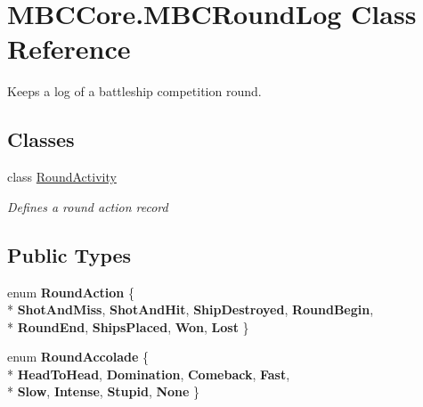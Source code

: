 \hypertarget{class_m_b_c_core_1_1_m_b_c_round_log}{\section{M\-B\-C\-Core.\-M\-B\-C\-Round\-Log Class Reference}
\label{class_m_b_c_core_1_1_m_b_c_round_log}
}


Keeps a log of a battleship competition round. 


\subsection*{Classes}
\begin{DoxyCompactItemize}
\item 
class \hyperlink{class_m_b_c_core_1_1_m_b_c_round_log_1_1_round_activity}{Round\-Activity}
\begin{DoxyCompactList}\small\item\em Defines a round action record\end{DoxyCompactList}\end{DoxyCompactItemize}
\subsection*{Public Types}
\begin{DoxyCompactItemize}
\item 
enum {\bfseries Round\-Action} \{ \\*
{\bfseries Shot\-And\-Miss}, 
{\bfseries Shot\-And\-Hit}, 
{\bfseries Ship\-Destroyed}, 
{\bfseries Round\-Begin}, 
\\*
{\bfseries Round\-End}, 
{\bfseries Ships\-Placed}, 
{\bfseries Won}, 
{\bfseries Lost}
 \}
\item 
enum {\bfseries Round\-Accolade} \{ \\*
{\bfseries Head\-To\-Head}, 
{\bfseries Domination}, 
{\bfseries Comeback}, 
{\bfseries Fast}, 
\\*
{\bfseries Slow}, 
{\bfseries Intense}, 
{\bfseries Stupid}, 
{\bfseries None}
 \}
\end{DoxyCompactItemize}
